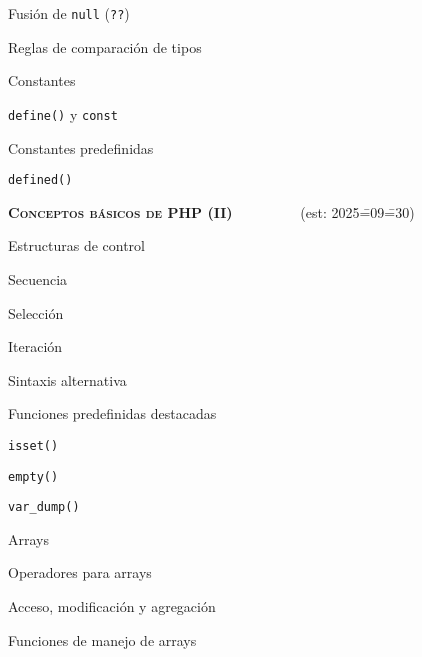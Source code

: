 \begin{longenum}
\begin{longenum}
\begin{longenum}
\begin{longenum}
                \item Fusión de \texttt{null} (\texttt{??})
                \item Reglas de comparación de tipos
            \end{longenum}
        \end{longenum}
        \item Constantes
        \begin{longenum}
            \item \texttt{define()} y \texttt{const}
            \item Constantes predefinidas
            \item \texttt{defined()}
        \end{longenum}
    \end{longenum}
    \item \textbf{\textsc{Conceptos básicos de PHP (II)}} \ \ \ \ \ \ \ \ \ (est: 2025\==09\==30)
    \begin{longenum}
        \item Estructuras de control
        \begin{longenum}
            \item Secuencia
            \item Selección
            \item Iteración
            \item Sintaxis alternativa
        \end{longenum}
        \item Funciones predefinidas destacadas
        \begin{longenum}
            \item \texttt{isset()}
            \item \texttt{empty()}
            \item \texttt{var\_dump()}
        \end{longenum}
        \item Arrays
        \begin{longenum}
            \item Operadores para arrays
            \begin{longenum}
                \item Acceso, modificación y agregación
            \end{longenum}
            \item Funciones de manejo de arrays
            \begin{longenum}

\end{longenum}
\end{longenum}
\end{longenum}
\end{longenum}
